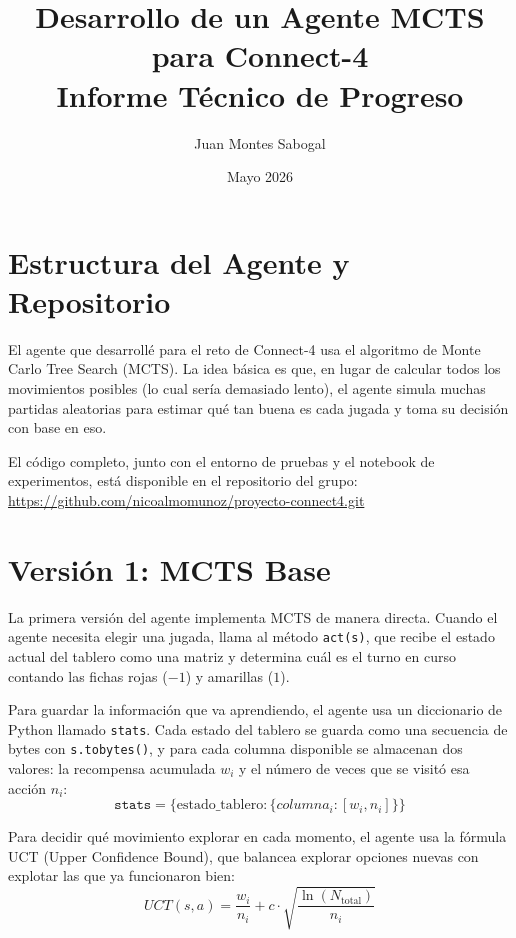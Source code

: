 \documentclass[11pt,a4paper]{article}
\title{\vspace{-1.5cm} \textbf{Desarrollo de un Agente MCTS para Connect-4} \\ \large Informe Técnico de Progreso}
\author{Juan Montes Sabogal}
\date{Mayo 2026}
\begin{document}
\maketitle

\section{Estructura del Agente y Repositorio}

El agente que desarrollé para el reto de Connect-4 usa el algoritmo de Monte Carlo Tree Search (MCTS). La idea básica es que, en lugar de calcular todos los movimientos posibles (lo cual sería demasiado lento), el agente simula muchas partidas aleatorias para estimar qué tan buena es cada jugada y toma su decisión con base en eso.

El código completo, junto con el entorno de pruebas y el notebook de experimentos, está disponible en el repositorio del grupo: \\
\url{https://github.com/nicoalmomunoz/proyecto-connect4.git}

\section{Versión 1: MCTS Base}

La primera versión del agente implementa MCTS de manera directa. Cuando el agente necesita elegir una jugada, llama al método \texttt{act(s)}, que recibe el estado actual del tablero como una matriz y determina cuál es el turno en curso contando las fichas rojas ($-1$) y amarillas ($1$).

Para guardar la información que va aprendiendo, el agente usa un diccionario de Python llamado \texttt{stats}. Cada estado del tablero se guarda como una secuencia de bytes con \texttt{s.tobytes()}, y para cada columna disponible se almacenan dos valores: la recompensa acumulada $w_i$ y el número de veces que se visitó esa acción $n_i$:
\begin{equation*}
\texttt{stats} = \{ \text{estado\_tablero}: \{ columna_i: [w_i, n_i] \} \}
\end{equation*}

Para decidir qué movimiento explorar en cada momento, el agente usa la fórmula UCT (Upper Confidence Bound), que balancea explorar opciones nuevas con explotar las que ya funcionaron bien:
\begin{equation}
UCT(s, a) = \frac{w_i}{n_i} + c \cdot \sqrt{\frac{\ln(N_{\text{total}})}{n_i}}
\end{equation}
\end{document}
